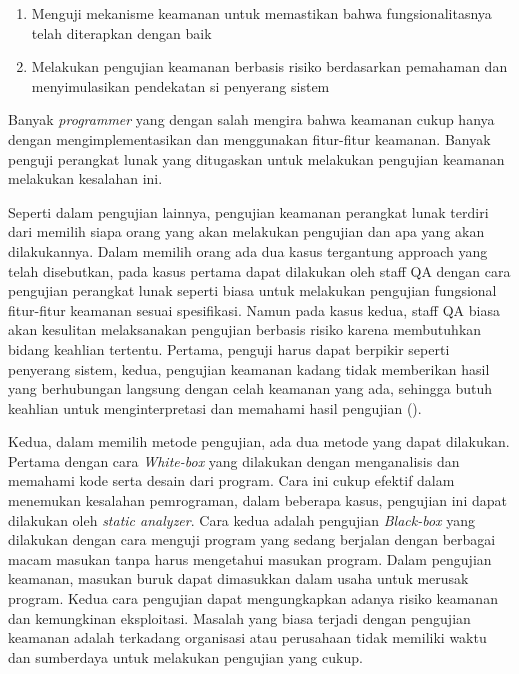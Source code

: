 \begin{enumerate}
      \item Menguji mekanisme keamanan untuk memastikan bahwa fungsionalitasnya telah diterapkan dengan baik
      \item Melakukan pengujian keamanan berbasis risiko berdasarkan pemahaman dan menyimulasikan pendekatan si penyerang sistem
\end{enumerate}

Banyak \emph{programmer} yang dengan salah mengira bahwa keamanan cukup hanya dengan mengimplementasikan dan
menggunakan fitur-fitur keamanan. Banyak penguji perangkat lunak yang ditugaskan untuk melakukan
pengujian keamanan melakukan kesalahan ini.

Seperti dalam pengujian lainnya, pengujian keamanan perangkat lunak terdiri dari memilih
siapa orang yang akan melakukan pengujian dan apa yang akan dilakukannya.
Dalam memilih orang ada dua kasus tergantung approach yang telah disebutkan,
pada kasus pertama dapat dilakukan oleh staff QA dengan cara pengujian
perangkat lunak seperti biasa untuk melakukan pengujian fungsional
fitur-fitur keamanan sesuai spesifikasi.
Namun pada kasus kedua, staff QA biasa akan kesulitan melaksanakan pengujian berbasis risiko
karena membutuhkan bidang keahlian tertentu.
Pertama, penguji harus dapat berpikir seperti penyerang sistem,
kedua, pengujian keamanan kadang tidak memberikan hasil yang berhubungan langsung dengan
celah keamanan yang ada, sehingga butuh keahlian untuk
menginterpretasi dan memahami hasil pengujian (\cite{grawsectest}).

Kedua, dalam memilih metode pengujian, ada dua metode yang dapat dilakukan.
Pertama dengan cara \emph{White-box} yang dilakukan dengan menganalisis dan memahami
kode serta desain dari program.
Cara ini cukup efektif dalam menemukan kesalahan pemrograman,
dalam beberapa kasus, pengujian ini dapat dilakukan oleh \emph{static analyzer}.
Cara kedua adalah pengujian \emph{Black-box} yang dilakukan dengan cara menguji program
yang sedang berjalan dengan berbagai macam masukan tanpa harus mengetahui masukan program.
Dalam pengujian keamanan, masukan buruk dapat dimasukkan dalam usaha untuk merusak program.
Kedua cara pengujian dapat mengungkapkan adanya risiko keamanan dan kemungkinan eksploitasi.
Masalah yang biasa terjadi dengan pengujian keamanan adalah terkadang organisasi atau perusahaan
tidak memiliki waktu dan sumberdaya untuk melakukan pengujian yang cukup.

